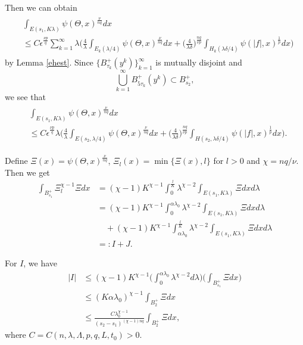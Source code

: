 \documentclass[11pt, reqno]{amsart}
\numberwithin{equation}{section}
\begin{document}
Then we can obtain
\begin{align}  \begin{split}
&\int_{E(s_{1},K\lambda)}\psi(\Theta, x)^{\frac{\nu}{nq}}  dx
\\ &\le C \epsilon^{\frac{\nu p}{q}} \sum_{k=1}^{\infty}\lambda  \bigg(
\frac{4}{\lambda} \int_{E_{k}(\lambda/4)}\psi(\Theta, x)^{\frac{\nu}{nq}} dx +
 \bigg( \frac{4}{\lambda\delta}\bigg)^{\frac{nq}{\nu p}}\int_{H_{k}(\lambda\delta/4)}\psi(|f|, x)^{\frac{1}{p}} dx \bigg)
\end{split}
\end{align}
by Lemma \ref{ehest}.
Since $\{ B_{\tau_{k}}^{+}(y^{k}) \}_{k=1}^{\infty}$ is mutually disjoint and $$ \bigcup_{k=1}^{\infty}B_{5\tau_{k}}^{+}(y^{k}) \subset B_{s_{2}}^{+},$$ we see that
\begin{align} \label{non2} \begin{split}
&\int_{E(s_{1},K\lambda)}\psi(\Theta, x)^{\frac{\nu}{nq}}  dx
\\ &\le C \epsilon^{\frac{\nu p}{q}} \lambda
 \bigg(\frac{4}{\lambda} \int_{E(s_{2},\lambda/4)}\psi(\Theta, x)^{\frac{\nu}{nq}} dx +
 \bigg( \frac{4}{\lambda\delta}\bigg)^{\frac{nq}{\nu p}}\int_{H(s_{2},\lambda\delta/4)}\psi(|f|, x)^{\frac{1}{p}} dx \bigg).
\end{split}
\end{align}

Define $\Xi(x)= \psi(\Theta, x)^{\frac{\nu}{nq}}$, $\Xi_{l}(x)=\min \{\Xi(x),l \}  $ for $l>0$ and $\chi = nq/\nu$.
Then we get
\begin{align*}
\int_{B_{s_{1}}^{+}}\Xi_{l}^{\chi-1} \Xi dx &
= (\chi -1)K^{\chi-1}\int_{0}^{\frac{l}{K}} \lambda^{\chi-2} \int_{E(s_{1},K\lambda)}  \Xi dx d\lambda
\\ & =(\chi -1)K^{\chi-1}\int_{0}^{\alpha \lambda_{0}} \lambda^{\chi-2} \int_{E(s_{1},K\lambda)}  \Xi dx d\lambda
\\ & \quad + (\chi -1)K^{\chi-1}\int_{\alpha \lambda_{0}}^{\frac{l}{K}} \lambda^{\chi-2} \int_{E(s_{1},K\lambda)}  \Xi dx d\lambda
\\ & =: I+J.
\end{align*}

For $I$, we have
\begin{align*}
|I| & \le  (\chi -1)K^{\chi-1} \bigg( \int_{0}^{\alpha \lambda_{0}} \lambda^{\chi-2}  d \lambda \bigg)
 \bigg( \int_{B_{s_{1}}^{+}} \Xi dx \bigg)
\\ & \le (K\alpha \lambda_{0})^{\chi-1}\int_{B_{2}^{+}} \Xi dx
\\ & \le \frac{C\lambda_{0}^{\chi-1}}{(s_{2}-s_{1})^{(\chi-1)nq}}\int_{B_{2}^{+}} \Xi dx,
\end{align*}
where $C=C(n,\lambda,\Lambda,p,q,L,t_{0})>0$.
\end{document}
